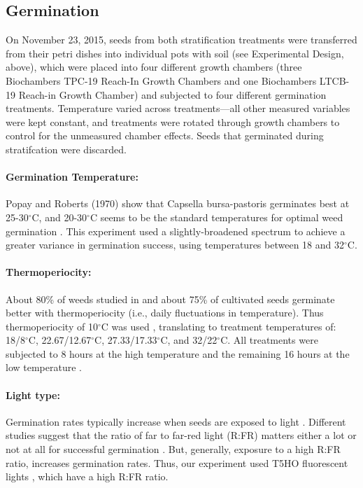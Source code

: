 \documentclass[12pt]{article}\usepackage[]{graphicx}\usepackage[]{color}
\begin{document}
	\subsection{Germination }
	On November 23, 2015, seeds from both stratification treatments were transferred from their petri dishes into individual pots with soil (see Experimental Design, above), which were placed into four different growth chambers (three Biochambers TPC-19 Reach-In Growth Chambers and one Biochambers LTCB-19 Reach-in Growth Chamber) and subjected to four different germination treatments. Temperature varied across treatments---all other measured variables were kept constant, and treatments were rotated through growth chambers to control for the unmeasured chamber effects. Seeds that germinated during stratifcation were discarded.
	
	\paragraph{Germination Temperature:} Popay and Roberts (1970) show that Capsella bursa-pastoris germinates best at 25-30$^\circ$C, and 20-30$^\circ$C seems to be the standard temperatures for optimal weed germination \parencite{Hartmann2010,Steinbauer1957,Wulff1994}. This experiment used a slightly-broadened spectrum to achieve a greater variance in germination success, using temperatures between 18 and 32$^\circ$C. 
	
	\paragraph{Thermoperiocity:} About 80\% of weeds studied in \textcite{Steinbauer1957} and about 75\% of cultivated seeds germinate better with thermoperiocity (i.e., daily fluctuations in temperature)\parencite{Toole1963,ISTA1954}. Thus thermoperiocity of 10$^\circ$C was used \parencite[see e.g.,][]{Steinbauer1957}, translating to treatment temperatures of: 18/8$^\circ$C, 22.67/12.67$^\circ$C, 27.33/17.33$^\circ$C, and 32/22$^\circ$C. All treatments were subjected to 8 hours at the high temperature and the remaining 16 hours at the low temperature \parencite{Baskin1998,Roberts1981,Popay1970,Probert2000}.
	
	
	\paragraph{Light type:} Germination rates typically increase when seeds are exposed to light \parencite[e.g.,][]{Baskin1998,Pons2000,Popay1970}. Different studies suggest that the ratio of far to far-red light (R:FR) matters either a lot or not at all for successful germination \parencite[e.g.,][]{Popay1970,Pons2000,Wulff1994}. But, generally, exposure to a high R:FR ratio, increases germination rates. Thus, our experiment used T5HO fluorescent lights \parencite{Toole1963}, which have a high R:FR ratio. 
	
\end{document}
